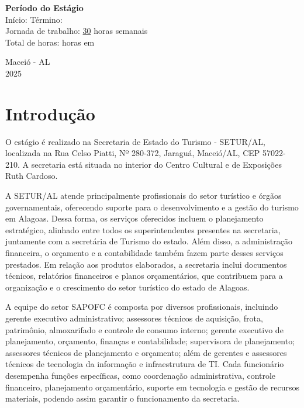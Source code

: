 \documentclass[12pt,a4paper]{article}
\begin{document}
	\vspace{0.5cm}
	\noindent \textbf{Período do Estágio} \\
	Início: \underline{\hspace{0,2cm}} \quad Término:\underline{\hspace{0,2cm}} \\
	Jornada de trabalho: \underline{30\hspace{0,2cm}} horas semanais \\
	Total de horas: \underline{\hspace{0,2cm}} horas em \underline{\hspace{0,2cm}} \\
	
	\vfill
	\begin{flushright}
		\centering Maceió - AL \\
		2025
	\end{flushright}
	
	\newpage
	
	\section{Introdução}
	
	\hspace*{1,5cm}  O estágio é realizado na Secretaria de Estado do Turismo - SETUR/AL, localizada na Rua Celso Piatti, Nº 280-372, Jaraguá, Maceió/AL, CEP 57022-210. A secretaria está situada no interior do Centro Cultural e de Exposições Ruth Cardoso.
	
	A SETUR/AL atende principalmente profissionais do setor turístico e órgãos governamentais, oferecendo suporte para o desenvolvimento e a gestão do turismo em Alagoas. Dessa forma, os serviços oferecidos incluem o planejamento estratégico, alinhado entre todos os superintendentes presentes na secretaria, juntamente com a secretária de Turismo do estado. Além disso, a administração financeira, o orçamento e a contabilidade também fazem parte desses serviços prestados. Em relação aos produtos elaborados, a secretaria inclui documentos técnicos, relatórios financeiros e planos orçamentários, que contribuem para a organização e o crescimento do setor turístico do estado de Alagoas.
	
	A equipe do setor SAPOFC é composta por diversos profissionais, incluindo gerente executivo administrativo; assessores técnicos de aquisição, frota, patrimônio, almoxarifado e controle de consumo interno; gerente executivo de planejamento, orçamento, finanças e contabilidade; supervisora de planejamento; assessores técnicos de planejamento e orçamento; além de gerentes e assessores técnicos de tecnologia da informação e infraestrutura de TI. Cada funcionário desempenha funções específicas, como coordenação administrativa, controle financeiro, planejamento orçamentário, suporte em tecnologia e gestão de recursos materiais, podendo assim garantir o funcionamento da secretaria.
\end{document}
